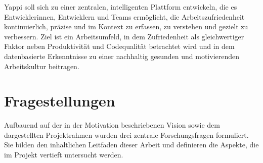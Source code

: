 \documentclass[12pt,a4paper]{report}
\begin{document}
Yappi soll sich zu einer zentralen, intelligenten Plattform entwickeln, die es Entwicklerinnen, Entwicklern und Teams ermöglicht,
die Arbeitszufriedenheit kontinuierlich, präzise und im Kontext zu erfassen, zu verstehen und gezielt zu verbessern. Ziel ist ein
Arbeitsumfeld, in dem Zufriedenheit als gleichwertiger Faktor neben Produktivität und Codequalität betrachtet wird und in dem
datenbasierte Erkenntnisse zu einer nachhaltig gesunden und motivierenden Arbeitskultur beitragen.

\section{Fragestellungen}

Aufbauend auf der in der Motivation beschriebenen Vision sowie dem dargestellten Projektrahmen wurden drei zentrale 
Forschungsfragen formuliert. Sie bilden den inhaltlichen Leitfaden dieser Arbeit und definieren die Aspekte, die im Projekt
vertieft untersucht werden.
\end{document}

